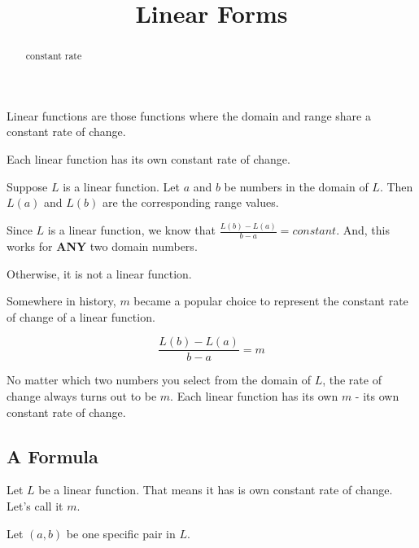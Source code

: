 \documentclass{ximera}
\title{Linear Forms}
\begin{document}
\begin{abstract}
constant rate
\end{abstract}
\maketitle










Linear functions are those functions where the domain and range share a constant rate of change.  





Each linear function has its own constant rate of change. 


Suppose $L$ is a linear function.  Let $a$ and $b$ be numbers in the domain of $L$.  Then $L(a)$ and $L(b)$ are the corresponding range values.

Since $L$ is a linear function, we know that $\frac{L(b) - L(a)}{b - a} = constant$.  And, this works for \textbf{\textcolor{purple!85!blue}{ANY}} two domain numbers.

Otherwise, it is not a linear function.







Somewhere in history, $m$ became a popular choice to represent the constant rate of change of a linear function.



\[
\frac{L(b) - L(a)}{b - a} = m
\]





No matter which two numbers you select from the domain of $L$, the rate of change always turns out to be $m$.  Each linear function has its own $m$ - its own constant rate of change.












\subsection*{A Formula}  


Let $L$ be a linear function.  That means it has is own constant rate of change.  Let's call it $m$. 

Let $(a, b)$ be one specific pair in $L$.
\end{document}
